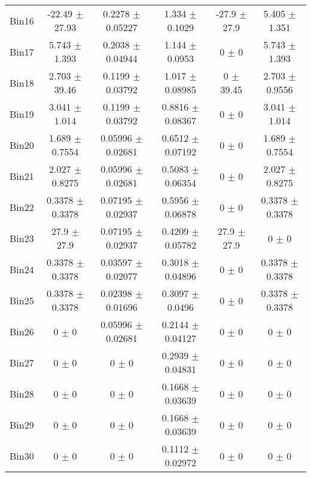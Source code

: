 \begin{tabular}{@{\extracolsep{4pt}}lccccc@{}}
     Bin16 & -22.49 $\pm$ 27.93 & 0.2278 $\pm$ 0.05227 & 1.334 $\pm$ 0.1029 & -27.9 $\pm$ 27.9 & 5.405 $\pm$ 1.351 \\ 
     Bin17 & 5.743 $\pm$ 1.393 & 0.2038 $\pm$ 0.04944 & 1.144 $\pm$ 0.0953 & 0 $\pm$ 0 & 5.743 $\pm$ 1.393 \\ 
     Bin18 & 2.703 $\pm$ 39.46 & 0.1199 $\pm$ 0.03792 & 1.017 $\pm$ 0.08985 & 0 $\pm$ 39.45 & 2.703 $\pm$ 0.9556 \\ 
     Bin19 & 3.041 $\pm$ 1.014 & 0.1199 $\pm$ 0.03792 & 0.8816 $\pm$ 0.08367 & 0 $\pm$ 0 & 3.041 $\pm$ 1.014 \\ 
     Bin20 & 1.689 $\pm$ 0.7554 & 0.05996 $\pm$ 0.02681 & 0.6512 $\pm$ 0.07192 & 0 $\pm$ 0 & 1.689 $\pm$ 0.7554 \\ 
     Bin21 & 2.027 $\pm$ 0.8275 & 0.05996 $\pm$ 0.02681 & 0.5083 $\pm$ 0.06354 & 0 $\pm$ 0 & 2.027 $\pm$ 0.8275 \\ 
     Bin22 & 0.3378 $\pm$ 0.3378 & 0.07195 $\pm$ 0.02937 & 0.5956 $\pm$ 0.06878 & 0 $\pm$ 0 & 0.3378 $\pm$ 0.3378 \\ 
     Bin23 & 27.9 $\pm$ 27.9 & 0.07195 $\pm$ 0.02937 & 0.4209 $\pm$ 0.05782 & 27.9 $\pm$ 27.9 & 0 $\pm$ 0 \\ 
     Bin24 & 0.3378 $\pm$ 0.3378 & 0.03597 $\pm$ 0.02077 & 0.3018 $\pm$ 0.04896 & 0 $\pm$ 0 & 0.3378 $\pm$ 0.3378 \\ 
     Bin25 & 0.3378 $\pm$ 0.3378 & 0.02398 $\pm$ 0.01696 & 0.3097 $\pm$ 0.0496 & 0 $\pm$ 0 & 0.3378 $\pm$ 0.3378 \\ 
     Bin26 & 0 $\pm$ 0 & 0.05996 $\pm$ 0.02681 & 0.2144 $\pm$ 0.04127 & 0 $\pm$ 0 & 0 $\pm$ 0 \\ 
     Bin27 & 0 $\pm$ 0 & 0 $\pm$ 0 & 0.2939 $\pm$ 0.04831 & 0 $\pm$ 0 & 0 $\pm$ 0 \\ 
     Bin28 & 0 $\pm$ 0 & 0 $\pm$ 0 & 0.1668 $\pm$ 0.03639 & 0 $\pm$ 0 & 0 $\pm$ 0 \\ 
     Bin29 & 0 $\pm$ 0 & 0 $\pm$ 0 & 0.1668 $\pm$ 0.03639 & 0 $\pm$ 0 & 0 $\pm$ 0 \\ 
     Bin30 & 0 $\pm$ 0 & 0 $\pm$ 0 & 0.1112 $\pm$ 0.02972 & 0 $\pm$ 0 & 0 $\pm$ 0 \\ 
\hline\hline
  \end{tabular}
